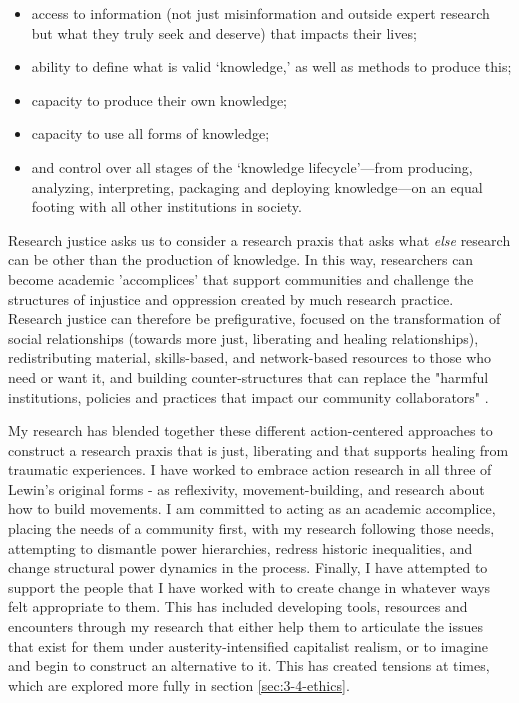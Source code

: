 \begin{itemize}
\item access to information (not just misinformation and outside expert research but what they truly seek and deserve) that impacts their lives; 
\item ability to define what is valid ‘knowledge,' as well as methods to produce this; 
\item capacity to produce their own knowledge; 
\item capacity to use all forms of knowledge; 
\item and control over all stages of the ‘knowledge lifecycle'—from producing, analyzing, interpreting, packaging and deploying knowledge—on an equal footing with all other institutions in society. \citep{jolivette_research_2015}
\end{itemize}

Research justice asks us to consider a research praxis that asks what \textit{else} research can be other than the production of knowledge. In this way, researchers can become academic 'accomplices' \citep{asad_academic_2019} that support communities and challenge the structures of injustice and oppression created by much research practice.  Research justice can therefore be prefigurative, focused on the transformation of social relationships (towards more just, liberating and healing relationships), redistributing material, skills-based, and network-based resources to those who need or want it, and building counter-structures that can replace the "harmful institutions, policies and practices that impact our community collaborators" \citep[13]{asad_prefigurative_2019}.

My research has blended together these different action-centered approaches to construct a research praxis that is just, liberating and that supports healing from traumatic experiences. I have worked to embrace action research in all three of Lewin's original forms - as reflexivity, movement-building, and research about how to build movements. I am committed to acting as an academic accomplice, placing the needs of a community first, with my research following those needs, attempting to dismantle power hierarchies, redress historic inequalities, and change structural power dynamics in the process. Finally, I have attempted to support the people that I have worked with to create change in whatever ways felt appropriate to them. This has included developing tools, resources and encounters through my research that either help them to articulate the issues that exist for them under austerity-intensified capitalist realism, or to imagine and begin to construct an alternative to it. This has created tensions at times, which are explored more fully in section \ref{sec:3-4-ethics}. 

